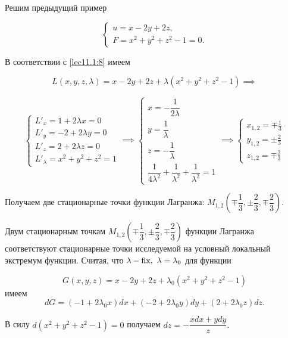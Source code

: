 \documentclass[../../main.tex]{subfiles}
\begin{document}
	\begin{exmp}
	
	Решим предыдущий пример 
	
	\[\begin{cases}
	u = x - 2y + 2z, \\
	F = x^2 + y^2 + z^2 - 1 = 0.
    \end{cases}\]
	
	В соответствии с \eqref{lec11.1:8} имеем 
	
	\[L \left( x, y, z, \lambda \right) = x - 2y + 2z + \lambda \left( x^2 + y^2 
	+ z^2 - 1 \right) \implies\]
	
	\[
	\begin{cases}
	L'_x = 1 + 2 \lambda x = 0 \\
	L'_y = -2 + 2 \lambda y = 0 \\
	L'_z = 2 + 2 \lambda z = 0 \\
	L'_\lambda = x^2 + y^2 + z^2 = 1
	\end{cases} \implies
	\begin{cases}
	x = -\dfrac{1}{2\lambda} \\
	y = \dfrac{1}{\lambda} \\
	z = -\dfrac{1}{\lambda} \\
	\dfrac{1}{4\lambda^2} + \dfrac{1}{\lambda^2} + \dfrac{1}{\lambda^2} = 1
	\end{cases} \implies
	\begin{cases}
	x_{1, 2} = \mp \frac{1}{3} \\
	y_{1, 2} = \pm \frac{2}{3} \\
	z_{1, 2} = \mp \frac{2}{3} 
	\end{cases}
	\]
	
	Получаем две стационарные точки функции Лагранжа: $M_{1, 2} \left( \mp \dfrac{1}{3}, 
	\pm \dfrac{2}{3}, \mp \dfrac{2}{3} \right)$.
	
	Двум стационарным точкам $M_{1, 2} \left( \mp \dfrac{1}{3}, 
	\pm \dfrac{2}{3}, \mp \dfrac{2}{3} \right)$ функции Лагранжа 
	соответствуют стационарные точки исследуемой на условный локальный экстремум функции. Считая, что $\lambda - \operatorname{fix},\  
	\lambda = \lambda_0$ для функции
	
	\[G\left( x, y, z \right) = x - 2y + 2z + 
	\lambda_0\left( x^2 + y^2 + z^2 - 1 \right)\]
	имеем
	\[
	dG = \left( -1 + 2 \lambda_0 x \right)dx + \left( -2 + 2\lambda_0 y\right)dy 
	+ \left( 2 + 2 \lambda_0 z\right) dz.\]
	
	В силу $d\left( x^2 + y^2 + z^2 - 1 
	\right) = 0$ получаем
	$dz = - \dfrac{xdx + ydy}{z}.$
	

\end{exmp}
\end{document}
